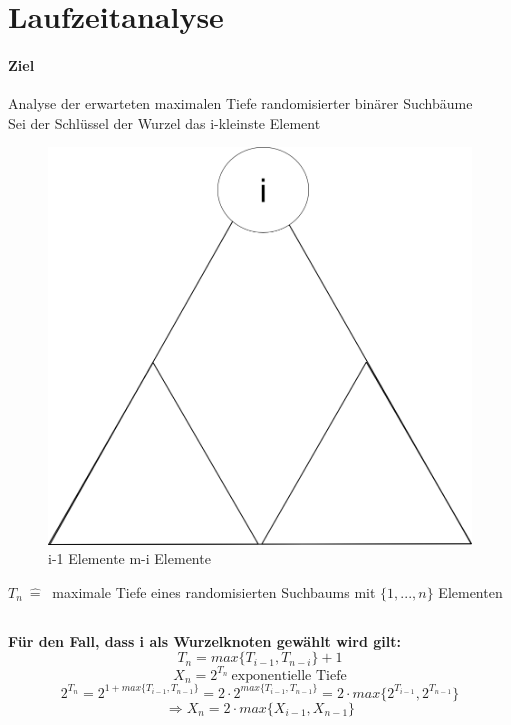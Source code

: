 \section{Laufzeitanalyse}
\paragraph{Ziel} Analyse der erwarteten maximalen Tiefe randomisierter binärer Suchbäume \\

Sei der Schlüssel der Wurzel das i-kleinste Element \\

\begin{figure}
	\vspace{-50pt}
\includegraphics[width=\linewidth]{10/Grafik/img3.png}
\noindent i-1 Elemente \hfill \hfill m-i Elemente
\caption{}
\end{figure}

\vspace{30pt}
$T_n ~\hat{=}~$ maximale Tiefe eines randomisierten Suchbaums mit $\{1,...,n\}$ Elementen\\
\vspace{50pt}


\pagebreak

\subsection*{}
\textbf{Für den Fall, dass i als Wurzelknoten gewählt wird gilt:}
\[T_n=max\{T_{i-1}, T_{n-i}\}+1\]
\[X_n = 2^{T_n} ~ \text{exponentielle Tiefe}\]
\[2^{T_n} = 2^{1+max\{T_{i-1}, T_{n-1}\}} = 2 \cdot 2^{max\{T_{i-1}, T_{n-1}\}} = 2 \cdot max\{2^{T_{i-1}}, 2^{T_{n-1}}\}\]
\[\Rightarrow X_n = 2 \cdot max\{X_{i-1}, X_{n-1}\} \] \\

